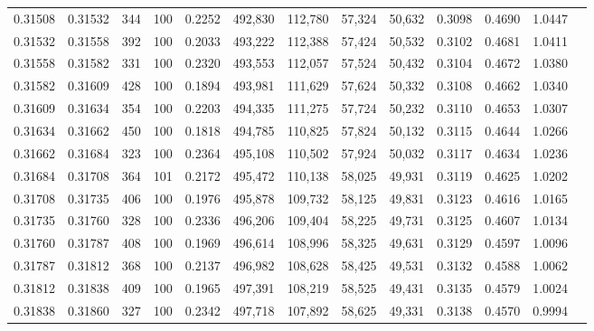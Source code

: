 \begin{tabular}{rrrrrrrrrrrrr}
0.31508 & 0.31532 &   344 & 100 &                                     0.2252 & 492,830 & 112,780 &  57,324 &  50,632 & 0.3098 & 0.4690 & 1.0447 \\
0.31532 & 0.31558 &   392 & 100 &                                     0.2033 & 493,222 & 112,388 &  57,424 &  50,532 & 0.3102 & 0.4681 & 1.0411 \\
0.31558 & 0.31582 &   331 & 100 &                                     0.2320 & 493,553 & 112,057 &  57,524 &  50,432 & 0.3104 & 0.4672 & 1.0380 \\
0.31582 & 0.31609 &   428 & 100 &                                     0.1894 & 493,981 & 111,629 &  57,624 &  50,332 & 0.3108 & 0.4662 & 1.0340 \\
0.31609 & 0.31634 &   354 & 100 &                                     0.2203 & 494,335 & 111,275 &  57,724 &  50,232 & 0.3110 & 0.4653 & 1.0307 \\
0.31634 & 0.31662 &   450 & 100 &                                     0.1818 & 494,785 & 110,825 &  57,824 &  50,132 & 0.3115 & 0.4644 & 1.0266 \\
0.31662 & 0.31684 &   323 & 100 &                                     0.2364 & 495,108 & 110,502 &  57,924 &  50,032 & 0.3117 & 0.4634 & 1.0236 \\
0.31684 & 0.31708 &   364 & 101 &                                     0.2172 & 495,472 & 110,138 &  58,025 &  49,931 & 0.3119 & 0.4625 & 1.0202 \\
0.31708 & 0.31735 &   406 & 100 &                                     0.1976 & 495,878 & 109,732 &  58,125 &  49,831 & 0.3123 & 0.4616 & 1.0165 \\
0.31735 & 0.31760 &   328 & 100 &                                     0.2336 & 496,206 & 109,404 &  58,225 &  49,731 & 0.3125 & 0.4607 & 1.0134 \\
0.31760 & 0.31787 &   408 & 100 &                                     0.1969 & 496,614 & 108,996 &  58,325 &  49,631 & 0.3129 & 0.4597 & 1.0096 \\
0.31787 & 0.31812 &   368 & 100 &                                     0.2137 & 496,982 & 108,628 &  58,425 &  49,531 & 0.3132 & 0.4588 & 1.0062 \\
0.31812 & 0.31838 &   409 & 100 &                                     0.1965 & 497,391 & 108,219 &  58,525 &  49,431 & 0.3135 & 0.4579 & 1.0024 \\
0.31838 & 0.31860 &   327 & 100 &                                     0.2342 & 497,718 & 107,892 &  58,625 &  49,331 & 0.3138 & 0.4570 & 0.9994 \\

\end{tabular}
